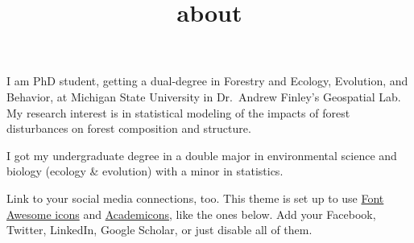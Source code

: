\documentclass[
]{article}
\title{about}
\author{}
\date{\vspace{-2.5em}}
\begin{document}
\maketitle

I am PhD student, getting a dual-degree in Forestry and Ecology,
Evolution, and Behavior, at Michigan State University in Dr.~Andrew
Finley's Geospatial Lab. My research interest is in statistical modeling
of the impacts of forest disturbances on forest composition and
structure.

I got my undergraduate degree in a double major in environmental science
and biology (ecology \& evolution) with a minor in statistics.

Link to your social media connections, too. This theme is set up to use
\href{https://fontawesome.com/}{Font Awesome icons} and
\href{https://jpswalsh.github.io/academicons/}{Academicons}, like the
ones below. Add your Facebook, Twitter, LinkedIn, Google Scholar, or
just disable all of them.
\end{document}
